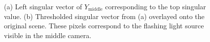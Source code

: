 \begin{figure}
  \begin{center}
    \caption{(a) Left singular vector of $Y_{\text{middle}}$ corresponding to the top
    singular value. (b) Thresholded singular vector from (a) overlayed onto the
    original scene. These pixels correspond to the flashing light source visible in the
    middle camera.}
    \label{fig:chpt10:mcca_pca_mid}
  \end{center}
\end{figure}

